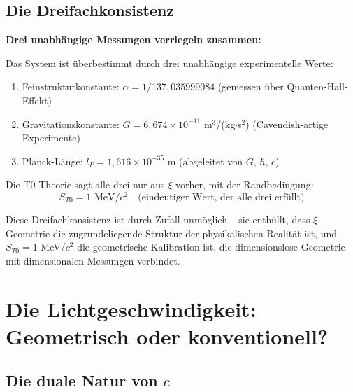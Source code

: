 \documentclass[12pt,a4paper]{article}
\begin{document}
	\subsection{Die Dreifachkonsistenz}
	
	\begin{insight}
		\textbf{Drei unabh{\"a}ngige Messungen verriegeln zusammen:}
		
		Das System ist {\"u}berbestimmt durch drei unabh{\"a}ngige experimentelle Werte:
		\begin{enumerate}
			\item Feinstrukturkonstante: $\alpha = 1/137{,}035999084$ (gemessen {\"u}ber Quanten-Hall-Effekt)
			\item Gravitationskonstante: $G = 6{,}674 \times 10^{-11}$ m$^3$/(kg$\cdot$s$^2$) (Cavendish-artige Experimente)
			\item Planck-L{\"a}nge: $l_P = 1{,}616 \times 10^{-35}$ m (abgeleitet von $G$, $\hbar$, $c$)
		\end{enumerate}
		
		Die T0-Theorie sagt alle drei nur aus $\xi$ vorher, mit der Randbedingung:
		\begin{equation}
			S_{T0} = 1 \text{ MeV}/c^2 \quad \text{(eindeutiger Wert, der alle drei erf{\"u}llt)}
		\end{equation}
		
		Diese Dreifachkonsistenz ist durch Zufall unm{\"o}glich -- sie enth{\"u}llt, dass $\xi$-Geometrie die zugrundeliegende Struktur der physikalischen Realit{\"a}t ist, und $S_{T0} = 1$ MeV/$c^2$ die geometrische Kalibration ist, die dimensionslose Geometrie mit dimensionalen Messungen verbindet.
	\end{insight}
	
	\section{Die Lichtgeschwindigkeit: Geometrisch oder konventionell?}
	
	\subsection{Die duale Natur von $c$}
	
\end{document}
